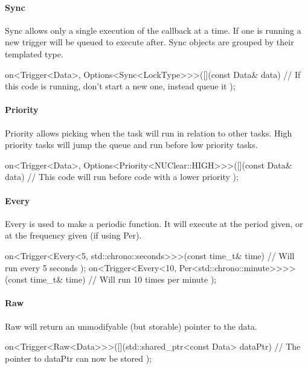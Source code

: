 \documentclass[a4paper]{article}
\begin{document}
    \paragraph{Sync} Sync allows only a single execution of the callback at a time.
    If one is running a new trigger will be queued to execute after.
    Sync objects are grouped by their templated type.\\
    \begin{cppcode}
        on<Trigger<Data>, Options<Sync<LockType>>>([](const Data& data) {
            // If this code is running, don't start a new one, instead queue it
        });
    \end{cppcode}

    \paragraph{Priority} Priority allows picking when the task will run in relation to other tasks.
    High priority tasks will jump the queue and run before low priority tasks.\\
    \begin{cppcode}
        on<Trigger<Data>, Options<Priority<NUClear::HIGH>>>([](const Data& data) {
            // This code will run before code with a lower priority
        });
    \end{cppcode}

    \paragraph{Every} Every is used to make a periodic function.
    It will execute at the period given, or at the frequency given (if using Per).\\
    \begin{cppcode}
        on<Trigger<Every<5, std::chrono::seconds>>>(const time_t& time) {
            // Will run every 5 seconds
        });
        on<Trigger<Every<10, Per<std::chrono::minute>>>>(const time_t& time) {
            // Will run 10 times per minute
        });
    \end{cppcode}

    \paragraph{Raw} Raw will return an unmodifyable (but storable) pointer to the data.\\
    \begin{cppcode}
        on<Trigger<Raw<Data>>>([](std::shared_ptr<const Data> dataPtr) {
            // The pointer to dataPtr can now be stored
        });
    \end{cppcode}
\end{document}
